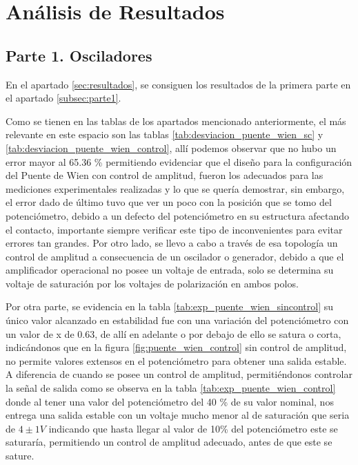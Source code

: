 
\section{Análisis de Resultados}

    \subsection{Parte 1. Osciladores}
        En el apartado \ref{sec:resultados}, se consiguen los resultados de la primera parte en el apartado \ref{subsec:parte1}.

        Como se tienen en las tablas de los apartados mencionado anteriormente, el más relevante en este espacio son las tablas \ref{tab:desviacion_puente_wien_sc} y \ref{tab:desviacion_puente_wien_control}, allí podemos observar que no hubo un error mayor al 65.36 \% permitiendo evidenciar que el diseño para la configuración del Puente de Wien con control de amplitud, fueron los adecuados para las mediciones experimentales realizadas y lo que se quería demostrar, sin embargo, el error dado de último tuvo que ver un poco con la posición que se tomo del potenciómetro, debido a un defecto del potenciómetro en su estructura afectando el contacto, importante siempre verificar este tipo de inconvenientes para evitar errores tan grandes. Por otro lado, se llevo a cabo a través de esa topología un control de amplitud a consecuencia de un oscilador o generador, debido a que el amplificador operacional no posee un voltaje de entrada, solo se determina su voltaje de saturación por los voltajes de polarización en ambos polos.

        Por otra parte, se evidencia en la tabla \ref{tab:exp_puente_wien_sincontrol} su único valor alcanzado en estabilidad fue con una variación del potenciómetro con un valor de x de 0.63, de allí en adelante o por debajo de ello se satura o corta, indicándonos que en la figura \ref{fig:puente_wien_control} sin control de amplitud, no permite valores extensos en el potenciómetro para obtener una salida estable. A diferencia de cuando se posee un control de amplitud, permitiéndonos controlar la señal de salida como se observa en la tabla \ref{tab:exp_puente_wien_control} donde al tener una valor del potenciómetro del 40 \% de su valor nominal, nos entrega una salida estable con un voltaje mucho menor al de saturación que seria de  $4 \pm 1 V$ indicando que hasta llegar al valor de 10\% del potenciómetro este se saturaría, permitiendo un control de amplitud adecuado, antes de que este se sature. 

